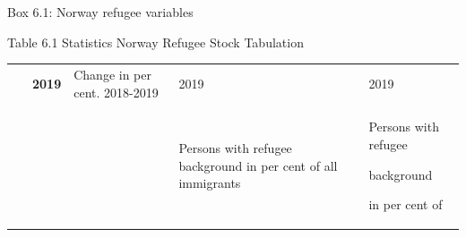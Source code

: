\documentclass[
]{article}
\begin{document}
Box 6.1: Norway refugee variables

Table 6.1 Statistics Norway Refugee Stock Tabulation

\begin{longtable}[]{@{}lllll@{}}
\toprule
\endhead
\begin{minipage}[t]{0.17\columnwidth}\raggedright
~\strut
\end{minipage} & \begin{minipage}[t]{0.17\columnwidth}\raggedright
\textbf{2019}\strut
\end{minipage} & \begin{minipage}[t]{0.17\columnwidth}\raggedright
Change in
per cent.
2018-2019\strut
\end{minipage} & \begin{minipage}[t]{0.17\columnwidth}\raggedright
2019\strut
\end{minipage} & \begin{minipage}[t]{0.17\columnwidth}\raggedright
2019\strut
\end{minipage}\tabularnewline
\begin{minipage}[t]{0.17\columnwidth}\raggedright
~\strut
\end{minipage} & \begin{minipage}[t]{0.17\columnwidth}\raggedright
\strut
\end{minipage} & \begin{minipage}[t]{0.17\columnwidth}\raggedright
\strut
\end{minipage} & \begin{minipage}[t]{0.17\columnwidth}\raggedright
Persons
with
refugee
background
in per cent
of all
immigrants\strut
\end{minipage} & \begin{minipage}[t]{0.17\columnwidth}\raggedright
Persons
with
refugee

background

in per cent
of


\end{minipage}
\end{longtable}
\end{document}
